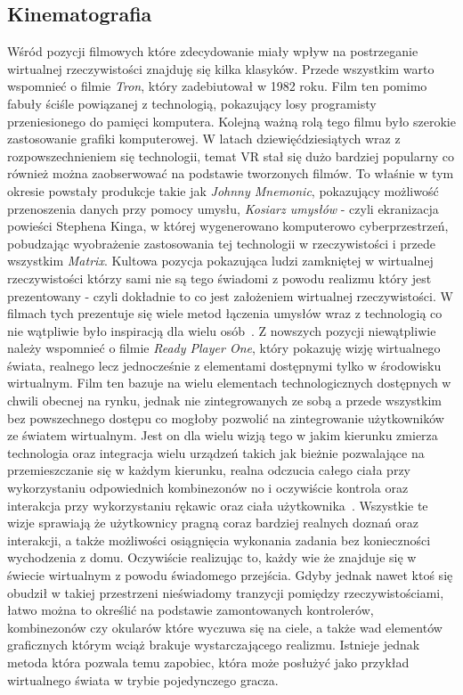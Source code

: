 	\subsection{Kinematografia}
	\label{subsec:kino}
	Wśród pozycji filmowych które zdecydowanie miały wpływ na postrzeganie wirtualnej rzeczywistości znajduję się kilka klasyków. Przede wszystkim warto wspomnieć o filmie \textit{Tron}, który zadebiutował w 1982 roku. Film ten pomimo fabuły ściśle powiązanej z technologią, pokazujący losy programisty przeniesionego do pamięci komputera. Kolejną ważną rolą tego filmu było szerokie zastosowanie grafiki komputerowej. W latach dziewięćdziesiątych wraz z rozpowszechnieniem się technologii, temat VR stał się dużo bardziej popularny co również można zaobserwować na podstawie tworzonych filmów. To właśnie w tym okresie powstały produkcje takie jak \textit{Johnny Mnemonic}, pokazujący możliwość przenoszenia danych przy pomocy umysłu, \textit{Kosiarz umysłów} - czyli ekranizacja powieści Stephena Kinga, w której wygenerowano komputerowo cyberprzestrzeń, pobudzając wyobrażenie zastosowania tej technologii w rzeczywistości i przede wszystkim \textit{Matrix}. Kultowa pozycja pokazująca ludzi zamkniętej w wirtualnej rzeczywistości którzy sami nie są tego świadomi z powodu realizmu który jest prezentowany - czyli dokładnie to co jest założeniem wirtualnej rzeczywistości. W filmach tych prezentuje się wiele metod łączenia umysłów wraz z technologią co nie wątpliwie było inspiracją dla wielu osób~\cite{filmy}. Z nowszych pozycji niewątpliwie należy wspomnieć o filmie \textit{Ready Player One}, który pokazuję wizję wirtualnego świata, realnego lecz jednocześnie z elementami dostępnymi tylko w środowisku wirtualnym. Film ten bazuje na wielu elementach technologicznych  dostępnych w chwili obecnej na rynku, jednak nie zintegrowanych ze sobą a przede wszystkim bez powszechnego dostępu co mogłoby pozwolić na zintegrowanie użytkowników ze światem wirtualnym. Jest on dla wielu wizją tego w jakim kierunku zmierza technologia oraz integracja wielu urządzeń takich jak bieżnie pozwalające na przemieszczanie się w każdym kierunku, realna odczucia całego ciała przy wykorzystaniu odpowiednich kombinezonów no i oczywiście kontrola oraz interakcja przy wykorzystaniu rękawic oraz ciała użytkownika~\cite{p1}. Wszystkie te wizje sprawiają że użytkownicy pragną coraz bardziej realnych doznań oraz interakcji, a także możliwości osiągnięcia wykonania zadania bez konieczności wychodzenia z domu. Oczywiście realizując to, każdy wie że znajduje się w świecie wirtualnym z powodu świadomego przejścia. Gdyby jednak nawet ktoś się obudził w takiej przestrzeni nieświadomy tranzycji pomiędzy rzeczywistościami, łatwo można to określić na podstawie zamontowanych kontrolerów, kombinezonów czy okularów które wyczuwa się na ciele, a także wad elementów graficznych którym wciąż brakuje wystarczającego realizmu. Istnieje jednak metoda która pozwala temu zapobiec, która może posłużyć jako przykład wirtualnego świata w trybie pojedynczego gracza.
	
